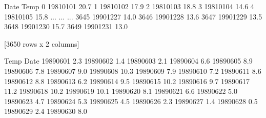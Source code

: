 \documentclass[letterpaper,10pt,english]{jupyterBook}
\begin{document}
\begin{sphinxVerbatim}[commandchars=\\\{\}]
            Date  Temp
0     1981\PYGZhy{}01\PYGZhy{}01  20.7
1     1981\PYGZhy{}01\PYGZhy{}02  17.9
2     1981\PYGZhy{}01\PYGZhy{}03  18.8
3     1981\PYGZhy{}01\PYGZhy{}04  14.6
4     1981\PYGZhy{}01\PYGZhy{}05  15.8
...          ...   ...
3645  1990\PYGZhy{}12\PYGZhy{}27  14.0
3646  1990\PYGZhy{}12\PYGZhy{}28  13.6
3647  1990\PYGZhy{}12\PYGZhy{}29  13.5
3648  1990\PYGZhy{}12\PYGZhy{}30  15.7
3649  1990\PYGZhy{}12\PYGZhy{}31  13.0

[3650 rows x 2 columns]
\end{sphinxVerbatim}

\begin{sphinxVerbatim}[commandchars=\\\{\}]
  
\end{sphinxVerbatim}

\begin{sphinxVerbatim}[commandchars=\\\{\}]
  
\end{sphinxVerbatim}

\begin{sphinxVerbatim}[commandchars=\\\{\}]
\PYG{p}{[}\PYG{p}{]}
\end{sphinxVerbatim}

\begin{sphinxVerbatim}[commandchars=\\\{\}]
            Temp
Date            
1989\PYGZhy{}06\PYGZhy{}01   2.3
1989\PYGZhy{}06\PYGZhy{}02   1.4
1989\PYGZhy{}06\PYGZhy{}03   2.1
1989\PYGZhy{}06\PYGZhy{}04   6.6
1989\PYGZhy{}06\PYGZhy{}05   8.9
1989\PYGZhy{}06\PYGZhy{}06   7.8
1989\PYGZhy{}06\PYGZhy{}07   9.0
1989\PYGZhy{}06\PYGZhy{}08  10.3
1989\PYGZhy{}06\PYGZhy{}09   7.9
1989\PYGZhy{}06\PYGZhy{}10   7.2
1989\PYGZhy{}06\PYGZhy{}11   8.6
1989\PYGZhy{}06\PYGZhy{}12   8.8
1989\PYGZhy{}06\PYGZhy{}13   6.2
1989\PYGZhy{}06\PYGZhy{}14   9.5
1989\PYGZhy{}06\PYGZhy{}15  10.2
1989\PYGZhy{}06\PYGZhy{}16   9.7
1989\PYGZhy{}06\PYGZhy{}17  11.2
1989\PYGZhy{}06\PYGZhy{}18  10.2
1989\PYGZhy{}06\PYGZhy{}19  10.1
1989\PYGZhy{}06\PYGZhy{}20   8.1
1989\PYGZhy{}06\PYGZhy{}21   6.6
1989\PYGZhy{}06\PYGZhy{}22   5.0
1989\PYGZhy{}06\PYGZhy{}23   4.7
1989\PYGZhy{}06\PYGZhy{}24   5.3
1989\PYGZhy{}06\PYGZhy{}25   4.5
1989\PYGZhy{}06\PYGZhy{}26   2.3
1989\PYGZhy{}06\PYGZhy{}27   1.4
1989\PYGZhy{}06\PYGZhy{}28   0.5
1989\PYGZhy{}06\PYGZhy{}29   2.4
1989\PYGZhy{}06\PYGZhy{}30   8.0
\end{sphinxVerbatim}
\end{document}
